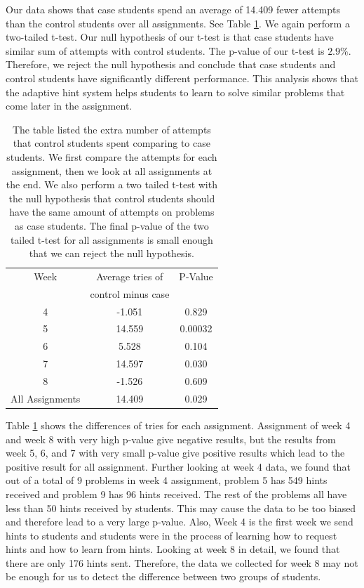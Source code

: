 \documentclass{llncs}
\begin{document}
Our data shows that case students spend an average of 14.409 fewer attempts than the control students over all assignments. See Table \ref{tab:no_hint}. We again perform a two-tailed t-test. Our null hypothesis of our t-test is that case students have similar sum of attempts with control students. The p-value of our t-test is $2.9\%$. Therefore, we reject the null hypothesis and conclude that case students and control students have significantly different performance. This analysis shows that the adaptive hint system helps students to learn to solve similar problems that come later in the assignment. 

\begin{table}
\caption{The table listed the extra number of attempts that control students spent comparing to case students. We first compare the attempts for each assignment, then we look at all assignments at the end. We also perform a two tailed t-test with the null hypothesis that control students should have the same amount of attempts on problems as case students. The final p-value of the two tailed t-test for all assignments is small enough that we can reject the null hypothesis.}
\begin{center}
  \begin{tabular}{| c | c | c |}
  \hline
   Week & Average tries of & P-Value \\
      & control minus case  & \\ \hline
	4 & -1.051 & 0.829 \\
	5 & 14.559 & 0.00032 \\
	6 & 5.528 & 0.104 \\
	7 & 14.597 & 0.030 \\
	8 & -1.526 & 0.609 \\ \hline
    All Assignments & 14.409 & 0.029 \\ 
    \hline
  \end{tabular}
  \label{tab:no_hint}
  \end{center}
\end{table}

Table \ref{tab:no_hint} shows the differences of tries for each assignment. Assignment of week 4 and week 8 with very high p-value give negative results, but the results from week 5, 6, and 7 with very small p-value give positive results which lead to the positive result for all assignment. Further looking at week 4 data, we found that out of a total of 9 problems in week 4 assignment, problem 5 has 549 hints received and problem 9 has 96 hints received. The rest of the problems all have less than 50 hints received by students. This may cause the data to be too biased and therefore lead to a very large p-value. Also, Week 4 is the first week we send hints to students and students were in the process of learning how to request hints and how to learn from hints. Looking at week 8 in detail, we found that there are only 176 hints sent. Therefore, the data we collected for week 8 may not be enough for us to detect the difference between two groups of students.
\end{document}
